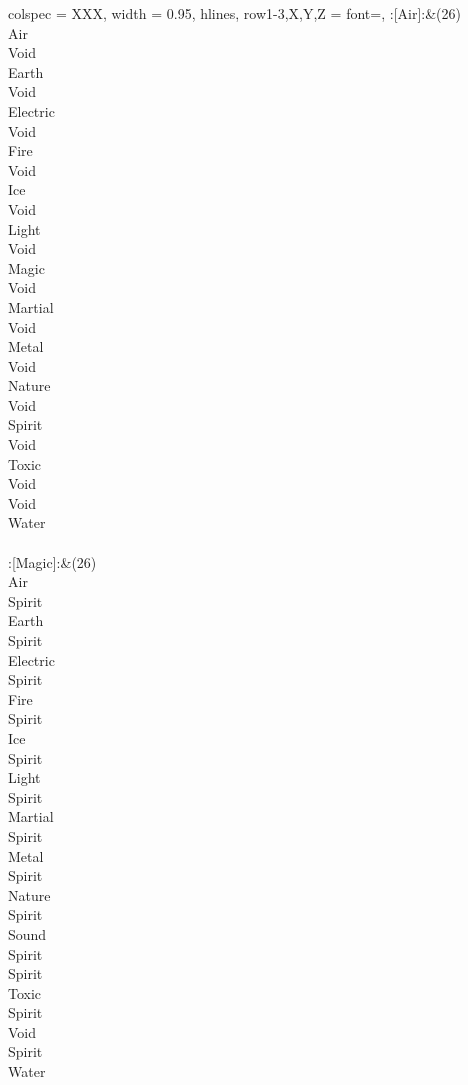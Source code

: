 \begin{longtblr}[
	caption = {2v1 Defending Weak},
	label = {2v1-Defending-Weak},
]{
	colspec = {XXX}, width = 0.95\linewidth,
	hlines,
	row{1-3,X,Y,Z} = {font=\bfseries},
}
	:[Air]:&{(26)\\
	Air \\
	Void \\
	Earth \\
	Void \\
	Electric \\
	Void \\
	Fire \\
	Void \\
	Ice \\
	Void \\
	Light \\
	Void \\
	Magic \\
	Void \\
	Martial \\
	Void \\
	Metal \\
	Void \\
	Nature \\
	Void \\
	Spirit \\
	Void \\
	Toxic \\
	Void \\
	Void \\
	Water \\
	}\\

	:[Magic]:&{(26)\\
	Air \\
	Spirit \\
	Earth \\
	Spirit \\
	Electric \\
	Spirit \\
	Fire \\
	Spirit \\
	Ice \\
	Spirit \\
	Light \\
	Spirit \\
	Martial \\
	Spirit \\
	Metal \\
	Spirit \\
	Nature \\
	Spirit \\
	Sound \\
	Spirit \\
	Spirit \\
	Toxic \\
	Spirit \\
	Void \\
	Spirit \\
	Water \\
	}\\


\end{longtblr}
